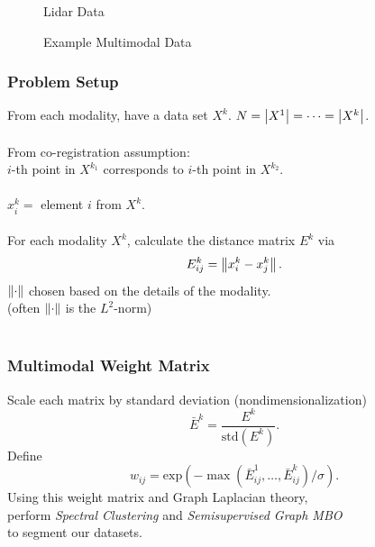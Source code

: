 \documentclass{beamer}
\begin{document}
\begin{frame}
\begin{figure}
\begin{minipage}[b]{0.40\linewidth}
      \caption{Lidar Data}
    \end{minipage}
    \caption{Example Multimodal Data}
  \end{figure}
\end{frame}


\begin{frame}
  \frametitle{Problem Setup}
  From each modality, have a data set $X^k$. $N = \left\lvert X^1\right\rvert = \cdots = \left\lvert X^k\right\rvert$.\\~\\
  From co-registration assumption: \\
  $i$-th point in $X^{k_1}$ corresponds to $i$-th point in $X^{k_2}$. \\~\\
  $x_i^k = $ element $i$ from $X^k$.\\~\\
  For each modality $X^k$, calculate the distance matrix $E^k$ via
  \[E^k_{ij} = \left\lVert x^k_i - x^k_j\right\rVert.\]
  $\left\lVert\cdot\right\rVert$ chosen based on the details of the modality.\\
  (often $\left\lVert\cdot\right\rVert$ is the $L^2$-norm) \\~\\
\end{frame}


\begin{frame}
  \frametitle{Multimodal Weight Matrix}
  Scale each matrix by standard deviation (nondimensionalization)
  \[\bar{E}^k = \frac{E^k}{\text{std}\left(E^k\right)}.\]
  Define \[w_{ij} = \text{exp}\left(-\max\left(\bar{E}^1_{ij},\ldots,\bar{E}^k_{ij}\right)/\sigma\right).\]
  Using this weight matrix and Graph Laplacian theory, \\
  perform \emph{Spectral Clustering} and \emph{Semisupervised Graph MBO}\\
  \cite{Merkurjev13} to segment our datasets.\\~\\
\end{frame}

\end{document}
